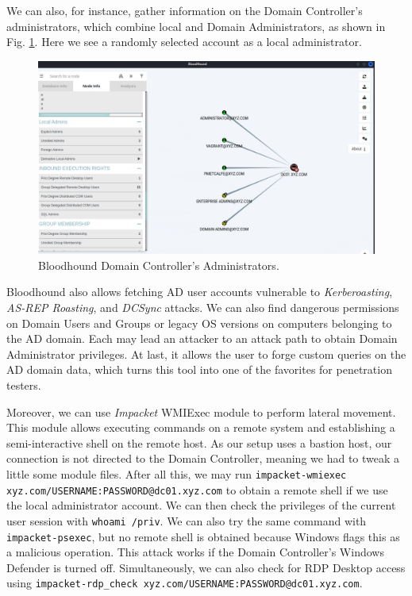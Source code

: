 We can also, for instance, gather information on the Domain Controller's administrators, which combine local and Domain Administrators, as shown in Fig. \ref{fig:bloodhound_dc_admins}. Here we see a randomly selected account as a local administrator.

\begin{figure}[H]
    \includegraphics[width=12cm]{figures/bloodhound_dc_admins.png}
    \caption{Bloodhound Domain Controller's Administrators.}
    \label{fig:bloodhound_dc_admins}
\end{figure}

Bloodhound also allows fetching AD user accounts vulnerable to \textit{Kerberoasting}, \textit{AS-REP Roasting}, and \textit{DCSync} attacks. We can also find dangerous permissions on Domain Users and Groups or legacy OS versions on computers belonging to the AD domain. Each may lead an attacker to an attack path to obtain Domain Administrator privileges. At last, it allows the user to forge custom queries on the AD domain data, which turns this tool into one of the favorites for penetration testers. 

Moreover, we can use \textit{Impacket} WMIExec module to perform lateral movement. This module allows executing commands on a remote system and establishing a semi-interactive shell on the remote host. As our setup uses a bastion host, our connection is not directed to the Domain Controller, meaning we had to tweak a little some module files. After all this, we may run \texttt{impacket-wmiexec xyz.com/USERNAME:PASSWORD@dc01.xyz.com} to obtain a remote shell if we use the local administrator account. We can then check the privileges of the current user session with \texttt{whoami /priv}. We can also try the same command with \texttt{impacket-psexec}, but no remote shell is obtained because Windows flags this as a malicious operation. This attack works if the Domain Controller's Windows Defender is turned off. Simultaneously, we can also check for RDP Desktop access using \texttt{impacket-rdp\_check xyz.com/USERNAME:PASSWORD@dc01.xyz.com}.

